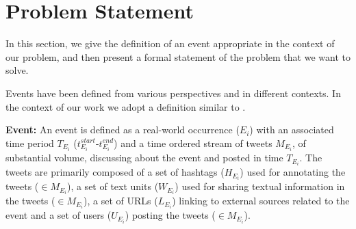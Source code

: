 
\section{Problem Statement\label{problemStatement}}
In this section, we give the definition of an event appropriate in the context of our problem, and then present a formal statement of the problem that we want to solve.

Events have been defined from various perspectives and in different contexts. In the context of our work we adopt a definition similar to \cite{becker2011beyond}. 

\textbf{Event:} An event is defined as a real-world occurrence ($E_{i}$) with an associated time period $\scriptstyle T_{E_{i}}$ ($t^{start}_{E_{i}}$-$t^{end}_{E_{i}}$) and a time ordered stream of tweets $M_{E_{i}}$, of substantial volume, discussing about the event and posted in time $T_{E_{i}}$.
The tweets are primarily composed of a set of hashtags ($H_{E_{i}}$) used for annotating the tweets ($\in M_{E_{i}}$), a set of text units ($W_{E_{i}}$) used for sharing textual information in the tweets ($\in M_{E_{i}}$), a set of URLs ($L_{E_{i}}$) linking to external sources related to the event and a  set of users ($U_{E_{i}}$) posting the tweets ($\in M_{E_{i}}$).



